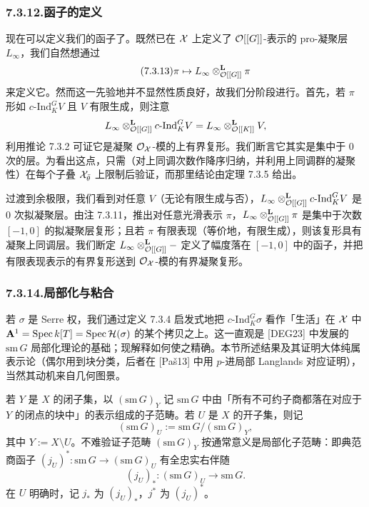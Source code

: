 \subsubsection*{7.3.12.\quad 函子的定义}
现在可以定义我们的函子了。既然已在 $\mathcal{X}$ 上定义了 $\mathcal{O}[[G]]$-表示的 pro-凝聚层 $L_\infty$，我们自然想通过
\begin{equation}\tag{7.3.13}\label{eq:a4-7-3-13}
\pi\mapsto L_\infty\otimes^{\mathbf L}_{\mathcal{O}[[G]]}\pi
\end{equation}
来定义它。然而这一先验地并不显然性质良好，故我们分阶段进行。首先，若 $\pi$ 形如 $c\text{-Ind}_K^GV$ 且 $V$ 有限生成，则注意
\[
L_\infty\otimes^{\mathbf L}_{\mathcal{O}[[G]]}c\text{-Ind}_K^GV=L_\infty\otimes^{\mathbf L}_{\mathcal{O}[[K]]}V,
\]
利用推论 7.3.2 可证它是凝聚 $\mathcal{O}_{\mathcal{X}}$-模的上有界复形。我们断言它其实是集中于 $0$ 次的层。为看出这点，只需（对上同调次数作降序归纳，并利用上同调群的凝聚性）在每个子叠 $\mathcal{X}_{\bar\theta}$ 上限制后验证，而那里结论由定理 7.3.5 给出。

过渡到余极限，我们看到对任意 $V$（无论有限生成与否），$L_\infty\otimes^{\mathbf L}_{\mathcal{O}[[G]]}c\text{-Ind}_K^GV$ 是 $0$ 次拟凝聚层。由注 7.3.11，推出对任意光滑表示 $\pi$，$L_\infty\otimes^{\mathbf L}_{\mathcal{O}[[G]]}\pi$ 是集中于次数 $[-1,0]$ 的拟凝聚层复形；且若 $\pi$ 有限表现（等价地，有限生成），则该复形具有凝聚上同调层。我们断定 $L_\infty\otimes^{\mathbf L}_{\mathcal{O}[[G]]}-$ 定义了幅度落在 $[-1,0]$ 中的函子，并把有限表现表示的有界复形送到 $\mathcal{O}_{\mathcal{X}}$-模的有界凝聚复形。

\subsubsection*{7.3.14.\quad 局部化与粘合}
若 $\sigma$ 是 Serre 权，我们通过定义 7.3.4 启发式地把 $c\text{-Ind}_K^G\sigma$ 看作「生活」在 $\mathcal{X}$ 中 $\mathbf A^1=\operatorname{Spec} k[T]=\operatorname{Spec}\mathcal H(\sigma)$ 的某个拷贝之上。这一直观是 [DEG23] 中发展的 $\mathrm{sm}\,G$ 局部化理论的基础；现解释如何使之精确。本节所述结果及其证明大体纯属表示论（偶尔用到块分类，后者在 [Paš13] 中用 $p$-进局部 Langlands 对应证明），当然其动机来自几何图景。

若 $Y$ 是 $X$ 的闭子集，以 $(\mathrm{sm}\,G)_Y$ 记 $\mathrm{sm}\,G$ 中由「所有不可约子商都落在对应于 $Y$ 的闭点的块中」的表示组成的子范畴。若 $U$ 是 $X$ 的开子集，则记
\[
(\mathrm{sm}\,G)_U:=\mathrm{sm}\,G/(\mathrm{sm}\,G)_Y,
\]
其中 $Y:=X\setminus U$。不难验证子范畴 $(\mathrm{sm}\,G)_Y$ 按通常意义是局部化子范畴：即典范商函子 $(j_U)^*:\mathrm{sm}\,G\to(\mathrm{sm}\,G)_U$ 有全忠实右伴随
\[
(j_U)_*:(\mathrm{sm}\,G)_U\to\mathrm{sm}\,G.
\]
在 $U$ 明确时，记 $j_*$ 为 $(j_U)_*$，$j^*$ 为 $(j_U)^*$。

